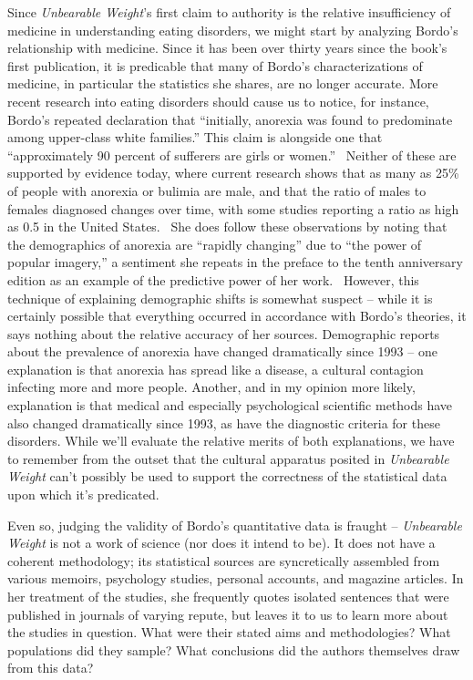 \documentclass[11pt]{article}
\begin{document}
    Since \textit{Unbearable Weight}'s first claim to authority is the relative insufficiency of medicine in understanding eating disorders, we might start by analyzing Bordo's relationship with medicine. Since it has been over thirty years since the book's first publication, it is predicable that many of Bordo's characterizations of medicine, in particular the statistics she shares, are no longer accurate. More recent research into eating disorders should cause us to notice, for instance, Bordo's repeated declaration that ``initially, anorexia was found to predominate among upper-class white families.'' This claim is alongside one that ``approximately 90 percent of sufferers are girls or women.''~\autocite[50]{Bordo03} Neither of these are supported by evidence today, where current research shows that as many as 25\% of people with anorexia or bulimia are male, and that the ratio of males to females diagnosed changes over time, with some studies reporting a ratio as high as 0.5 in the United States.~\autocite[1409]{Galmiche19} She does follow these observations by noting that the demographics of anorexia are ``rapidly changing'' due to ``the power of popular imagery,'' a sentiment she repeats in the preface to the tenth anniversary edition as an example of the predictive power of her work.~\autocite[320]{Bordo03} However, this technique of explaining demographic shifts is somewhat suspect -- while it is certainly possible that everything occurred in accordance with Bordo's theories, it says nothing about the relative accuracy of her sources. Demographic reports about the prevalence of anorexia have changed dramatically since 1993 -- one explanation is that anorexia has spread like a disease, a cultural contagion infecting more and more people. Another, and in my opinion more likely, explanation is that medical and especially psychological scientific methods have also changed dramatically since 1993, as have the diagnostic criteria for these disorders. While we'll evaluate the relative merits of both explanations, we have to remember from the outset that the cultural apparatus posited in \textit{Unbearable Weight} can't possibly be used to support the correctness of the statistical data upon which it's predicated.  
    
    Even so, judging the validity of Bordo's quantitative data is fraught -- \textit{Unbearable Weight} is not a work of science (nor does it intend to be). It does not have a coherent methodology; its statistical sources are syncretically assembled from various memoirs, psychology studies, personal accounts, and magazine articles. In her treatment of the studies, she frequently quotes isolated sentences that were published in journals of varying repute, but leaves it to us to learn more about the studies in question. What were their stated aims and methodologies? What populations did they sample? What conclusions did the authors themselves draw from this data? 
    
\end{document}
